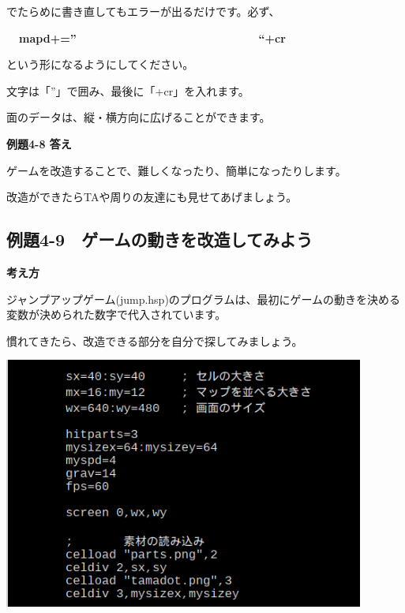 \documentclass[a4paper,12pt]{jarticle}
\begin{document}
\bigskip

でたらめに書き直してもエラーが出るだけです。必ず、


\bigskip

{\bfseries
\ \ mapd+=” \ \ \ \ \ \ \ \ \ \ \ \ \ \ \ \ \ \ \ \ \ \ \ \ \ \ \ \ “+cr}


\bigskip

という形になるようにしてください。

文字は「”」で囲み、最後に「+cr」を入れます。

面のデータは、縦・横方向に広げることができます。


\bigskip


\bigskip

{\bfseries
例題4-8 答え}


\bigskip

ゲームを改造することで、難しくなったり、簡単になったりします。

改造ができたらTAや周りの友達にも見せてあげましょう。


\clearpage
\subsection{例題4-9　ゲームの動きを改造してみよう}
\bigskip
\bigskip

{\bfseries
考え方}

\bigskip

ジャンプアップゲーム(jump.hsp)のプログラムは、最初にゲームの動きを決める変数が決められた数字で代入されています。

慣れてきたら、改造できる部分を自分で探してみましょう。

\bigskip
\bigskip

\begin{minipage}{9.781cm}
\centering
{\upshape
\includegraphics[keepaspectratio,width=11.853cm,height=8.266cm]{text04-img/text04-img026.png}}
\end{minipage}
\end{document}
